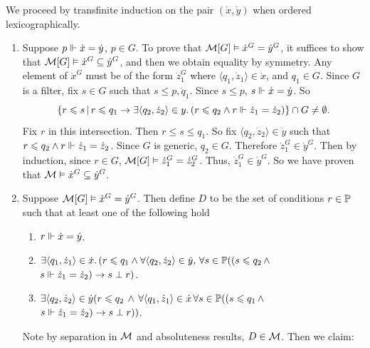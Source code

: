 \documentclass{article}
\begin{document}
    \proof We proceed by transfinite induction on the pair $(\dot{x},\dot{y})$ when ordered lexicographically. \begin{enumerate}
        \item[(i)] Suppose $p \Vdash \dot{x}=\dot{y}$, $p \in G$. To prove that $\mathcal{M}[G] \vDash \dot{x}^{G} = \dot{y}^{G}$, it suffices to show that $\mathcal{M}[G] \vDash \dot{x}^{G} \subseteq \dot{y}^{G}$, and then we obtain equality by symmetry.\gap
              Any element of $\dot{x}^{G}$ must be of the form $\dot{z}_{1}^{G}$ where $\langle q_{1}, \dot{z}_{1}\rangle \in \dot{x}$, and $q_{1} \in G$. Since $G$ is a filter, fix $s \in G$ such that $s \leq p, \dot{q}_{1}$. Since $s \leq p$, $s \Vdash \dot{x} = \dot{y}$. So \[\{ r \leqslant s \, | \, r \leqslant q_{1} \rightarrow \exists \langle q_{2}, \dot{z}_{2} \rangle \in y. \, ( r \leqslant q_{2} \wedge r \Vdash \dot{z}_{1} = \dot{z}_{2})\} \cap G \neq \emptyset.\] Fix $r$ in this intersection. Then $r \leq s \leq q_{1}$. So fix $\langle q_{2}, \dot{z}_{2}\rangle \in \dot{y}$ such that $r \leqslant q_{2} \wedge r \Vdash \dot{z}_{1} = \dot{z}_{2}$. Since $G$ is generic, $q_{2} \in G$. Therefore $\dot{z}_{1}^{G} \in \dot{y}^{G}$. Then by induction, since $r \in G$, $\mathcal{M}[G] \vDash \dot{z}_{1}^{G} = \dot{z}_{2}^{G}$. Thus, $\dot{z}_{1}^{G} \in \dot{y}^{G}$. So we have proven that $\mathcal{M} \vDash \dot{x}^{G} \subseteq \dot{y}^{G}$.
        \item[(ii)] Suppose $\mathcal{M}[G] \vDash \dot{x}^{G} = \dot{y}^{G}$. Then define $D$ to be the set of conditions $r \in \mathbb{P}$ such that at least one of the following hold \begin{enumerate}
                  \item[(0)] $r \Vdash \dot{x} = \dot{y}$.
                  \item [(a')]
                        $\exists \langle q_{1}, \dot{z}_{1} \rangle \in \dot{x}. \, (r \leqslant q_{1} \wedge \forall \langle q_{2}, \dot{z}_{2} \rangle \in \dot{y}, \, \forall s \in \mathbb{P} ((s \leqslant q_{2} \, \wedge$ $ s \Vdash \dot{z}_{1} = \dot{z}_{2}) \rightarrow s \perp r)$.
                  \item[(b')]$\exists \langle q_{2}, \dot{z}_{2} \rangle \in \dot{y} (r \leqslant q_{2} \, \wedge \, \forall \langle q_{1}, \dot{z}_{1}\rangle \in \dot{x}\, \forall s \in \mathbb{P} (( s \leqslant q_{1} \, \wedge $ $ s \Vdash \dot{z}_{1} = \dot{z}_{2}) \rightarrow s \perp r))$.
              \end{enumerate}
              Note by separation in $\mathcal{M}$ and absoluteness results, $D \in \mathcal{M}$. Then we claim: \gap

\end{enumerate}
\end{document}
